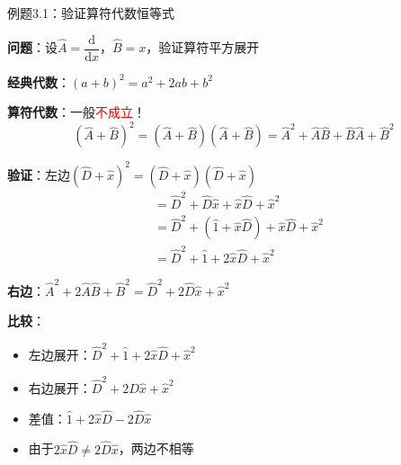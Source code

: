 \documentclass[aspectratio=169, 10pt]{beamer}
\begin{document}
\begin{frame}{例题3.1：验证算符代数恒等式}

  \textbf{问题}：设$\hat{A} = \dfrac{\mathrm{d}}{\mathrm{d}x}$，$\hat{B} = x$，验证算符平方展开

  \iqbsep

  \begin{iqbitemize}
    \item \textbf{经典代数}：$(a+b)^2 = a^2 + 2ab + b^2$

    \item \textbf{算符代数}：一般\textcolor{red}{不成立}！
    \[
      (\hat{A} + \hat{B})^2 = (\hat{A} + \hat{B})(\hat{A} + \hat{B}) = \hat{A}^2 + \hat{A}\hat{B} + \hat{B}\hat{A} + \hat{B}^2
    \]

    \item \textbf{验证}：左边$(\hat{D} + \hat{x})^2 = (\hat{D} + \hat{x})(\hat{D} + \hat{x})$
    \begin{align*}
      &= \hat{D}^2 + \hat{D}\hat{x} + \hat{x}\hat{D} + \hat{x}^2 \\
      &= \hat{D}^2 + (\hat{1} + \hat{x}\hat{D}) + \hat{x}\hat{D} + \hat{x}^2 \\
      &= \hat{D}^2 + \hat{1} + 2\hat{x}\hat{D} + \hat{x}^2
    \end{align*}

    \item \textbf{右边}：$\hat{A}^2 + 2\hat{A}\hat{B} + \hat{B}^2 = \hat{D}^2 + 2\hat{D}\hat{x} + \hat{x}^2$

    \item \textbf{比较}：
    \begin{itemize}
      \setlength{\itemsep}{0.05cm}
      \item 左边展开：$\hat{D}^2 + \hat{1} + 2\hat{x}\hat{D} + \hat{x}^2$
      \item 右边展开：$\hat{D}^2 + 2\hat{D}\hat{x} + \hat{x}^2$
      \item 差值：$\hat{1} + 2\hat{x}\hat{D} - 2\hat{D}\hat{x}$
      \item 由于$2\hat{x}\hat{D} \neq 2\hat{D}\hat{x}$，两边不相等
    \end{itemize}
  \end{iqbitemize}

\end{frame}
\end{document}
